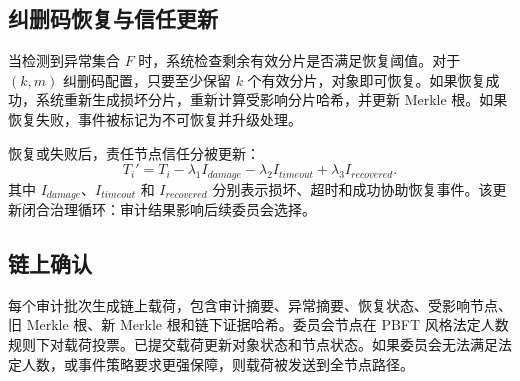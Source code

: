 \subsection{纠删码恢复与信任更新}

当检测到异常集合 $F$ 时，系统检查剩余有效分片是否满足恢复阈值。对于 $(k,m)$ 纠删码配置，只要至少保留 $k$ 个有效分片，对象即可恢复。如果恢复成功，系统重新生成损坏分片，重新计算受影响分片哈希，并更新 Merkle 根。如果恢复失败，事件被标记为不可恢复并升级处理。

恢复或失败后，责任节点信任分被更新：
\begin{equation}
  T_i' = T_i - \lambda_1 I_{damage} - \lambda_2 I_{timeout} + \lambda_3 I_{recovered}.
\end{equation}
其中 $I_{damage}$、$I_{timeout}$ 和 $I_{recovered}$ 分别表示损坏、超时和成功协助恢复事件。该更新闭合治理循环：审计结果影响后续委员会选择。

\subsection{链上确认}

每个审计批次生成链上载荷，包含审计摘要、异常摘要、恢复状态、受影响节点、旧 Merkle 根、新 Merkle 根和链下证据哈希。委员会节点在 PBFT 风格法定人数规则下对载荷投票。已提交载荷更新对象状态和节点状态。如果委员会无法满足法定人数，或事件策略要求更强保障，则载荷被发送到全节点路径。


